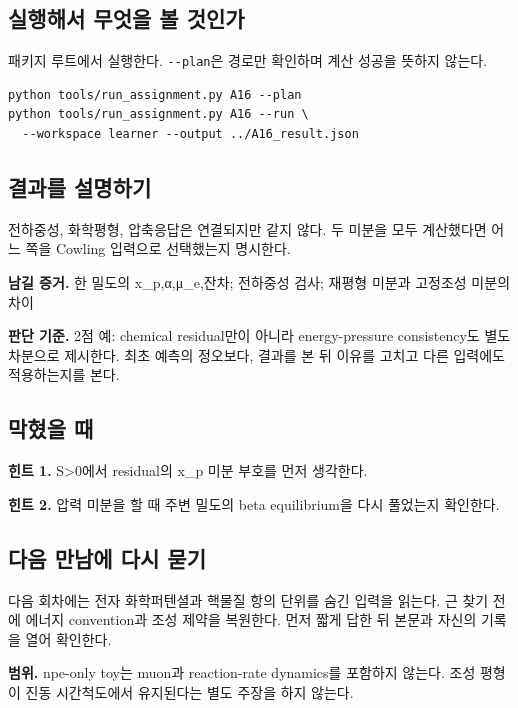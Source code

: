 \documentclass[
  10pt,
  a4paper,
]{article}
\begin{document}
\newpage

\subsection{실행해서 무엇을 볼
것인가}\label{uxc2e4uxd589uxd574uxc11c-uxbb34uxc5c7uxc744-uxbcfc-uxac83uxc778uxac00}

패키지 루트에서 실행한다. \texttt{-\/-plan}은 경로만 확인하며 계산
성공을 뜻하지 않는다.

\begin{verbatim}
python tools/run_assignment.py A16 --plan
python tools/run_assignment.py A16 --run \
  --workspace learner --output ../A16_result.json
\end{verbatim}

\subsection{결과를
설명하기}\label{uxacb0uxacfcuxb97c-uxc124uxba85uxd558uxae30}

전하중성, 화학평형, 압축응답은 연결되지만 같지 않다. 두 미분을 모두
계산했다면 어느 쪽을 Cowling 입력으로 선택했는지 명시한다.

\textbf{남길 증거.} 한 밀도의 x\_p,α,μ\_e,잔차; 전하중성 검사; 재평형
미분과 고정조성 미분의 차이

\textbf{판단 기준.} 2점 예: chemical residual만이 아니라 energy-pressure
consistency도 별도 차분으로 제시한다. 최초 예측의 정오보다, 결과를 본 뒤
이유를 고치고 다른 입력에도 적용하는지를 본다.

\subsection{막혔을 때}\label{uxb9c9uxd614uxc744-uxb54c}

\textbf{힌트 1.} S\textgreater0에서 residual의 x\_p 미분 부호를 먼저
생각한다.

\textbf{힌트 2.} 압력 미분을 할 때 주변 밀도의 beta equilibrium을 다시
풀었는지 확인한다.

\subsection{다음 만남에 다시
묻기}\label{uxb2e4uxc74c-uxb9ccuxb0a8uxc5d0-uxb2e4uxc2dc-uxbb3buxae30}

다음 회차에는 전자 화학퍼텐셜과 핵물질 항의 단위를 숨긴 입력을 읽는다.
근 찾기 전에 에너지 convention과 조성 제약을 복원한다. 먼저 짧게 답한 뒤
본문과 자신의 기록을 열어 확인한다.

\textbf{범위.} npe-only toy는 muon과 reaction-rate dynamics를 포함하지
않는다. 조성 평형이 진동 시간척도에서 유지된다는 별도 주장을 하지
않는다.
\end{document}
